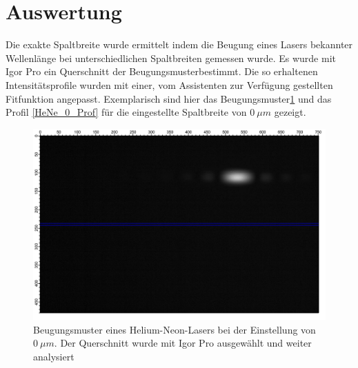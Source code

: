 %
%
\section {Auswertung}
Die exakte Spaltbreite wurde ermittelt indem die Beugung eines Lasers bekannter Wellenlänge bei unterschiedlichen Spaltbreiten gemessen wurde. Es wurde mit Igor Pro ein Querschnitt der Beugungsmusterbestimmt. Die so erhaltenen Intensitätsprofile wurden mit einer, vom Assistenten zur Verfügung gestellten Fitfunktion angepasst. Exemplarisch sind hier das Beugungsmuster\ref{HeNe_0} und das Profil \ref{HeNe_0_Prof} für die eingestellte Spaltbreite von $0~\mu m$ gezeigt.

\begin{figure}[H]
	\centering	
	\begin{minipage}{0.8\textwidth}
		\includegraphics[width=\columnwidth]{180618/Graph0.png}
	\end{minipage}
	\caption{Beugungsmuster eines Helium-Neon-Lasers bei der Einstellung von $0~\mu m$. Der Querschnitt wurde mit Igor Pro ausgewählt und weiter analysiert }
	\label{HeNe_0}
\end{figure}


